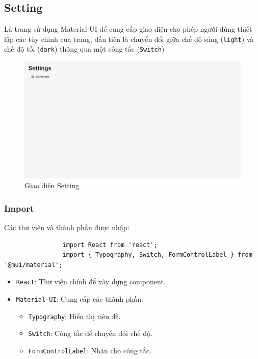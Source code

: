         \subsection{Setting}
            \hspace*{0.6cm}Là trang sử dụng Material-UI để cung cấp giao diện cho phép người dùng thiết lập các tùy chỉnh của trang, đầu tiên là chuyển đổi giữa chế độ sáng (\texttt{light}) và chế độ tối (\texttt{dark}) thông qua một công tắc (\texttt{Switch})
            \begin{figure}[H]
                \centering
                \includegraphics[width=1\textwidth]{pictures/Setting.png}
                \caption{Giao diện Setting}
                \label{fig:setting}
            \end{figure}
            \subsubsection{Import}
                \hspace{0.6cm}Các thư viện và thành phần được nhập:
                \begin{lstlisting}
                import React from 'react';
                import { Typography, Switch, FormControlLabel } from '@mui/material';
                \end{lstlisting}
                \begin{itemize}
                    \item \texttt{React}: Thư viện chính để xây dựng component.
                    \item \texttt{Material-UI}: Cung cấp các thành phần:
                    \begin{itemize}
                        \item \texttt{Typography}: Hiển thị tiêu đề.
                        \item \texttt{Switch}: Công tắc để chuyển đổi chế độ.
                        \item \texttt{FormControlLabel}: Nhãn cho công tắc.
                    \end{itemize}
                \end{itemize}

